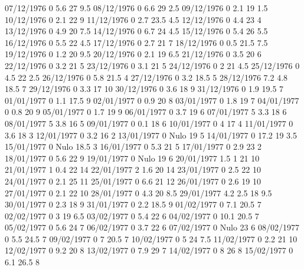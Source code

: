 07/12/1976  0      5.6    27     9.5 
08/12/1976  0      6.6    29     2.5 
09/12/1976  0      2.1    19     1.5 
10/12/1976  0      2.1    22     9 
11/12/1976  0      2.7    23.5   4.5 
12/12/1976  0      4.4    23     4 
13/12/1976  0      4.9    20     7.5 
14/12/1976  0      6.7    24     4.5 
15/12/1976  0      5.4    26     5.5 
16/12/1976  0      5.5    22     4.5 
17/12/1976  0      2.7    21     7 
18/12/1976  0      0.5    21.5   7.5 
19/12/1976  0      1.2    20     9.5 
20/12/1976  0      2.1    19     6.5 
21/12/1976  0      3.5    20     6 
22/12/1976  0      3.2    21     5 
23/12/1976  0      3.1    21     5 
24/12/1976  0      2      21     4.5 
25/12/1976  0      4.5    22     2.5 
26/12/1976  0      5.8    21.5   4 
27/12/1976  0      3.2    18.5   5 
28/12/1976  7.2    4.8    18.5   7 
29/12/1976  0      3.3    17     10 
30/12/1976  0      3.6    18     9 
31/12/1976  0      1.9    19.5   7 
01/01/1977  0      1.1    17.5   9 
02/01/1977  0      0.9    20     8 
03/01/1977  0      1.8    19     7 
04/01/1977  0      0.8    20     9 
05/01/1977  0      1.7    19     9 
06/01/1977  0      3.7    19     6 
07/01/1977  5      3.3    18     6 
08/01/1977  5      3.8    16     5 
09/01/1977  0      0.1    18     6 
10/01/1977  0      4      17     4 
11/01/1977  0      3.6    18     3 
12/01/1977  0      3.2    16     2 
13/01/1977  0     Nulo    19     5 
14/01/1977  0      17.2   19     3.5 
15/01/1977  0     Nulo    18.5   3 
16/01/1977  0      5.3    21     5 
17/01/1977  0      2.9    23     2 
18/01/1977  0      5.6    22     9 
19/01/1977  0     Nulo    19     6 
20/01/1977  1.5    1      21     10 
21/01/1977  1      0.4    22     14 
22/01/1977  2      1.6    20     14 
23/01/1977  0      2.5    22     10 
24/01/1977  0      2.1    25     11 
25/01/1977  0      6.6    21     12 
26/01/1977  0      2.6    19     10 
27/01/1977  0      2.1    22     10 
28/01/1977  0      4.3    20     8.5 
29/01/1977  4.2    2.5    18     9.5 
30/01/1977  0      2.3    18     9 
31/01/1977  0      2.2    18.5   9 
01/02/1977  0      7.1    20.5   7 
02/02/1977  0      3      19     6.5 
03/02/1977  0      5.4    22     6 
04/02/1977  0      10.1   20.5   7 
05/02/1977  0      5.6    24     7 
06/02/1977  0      3.7    22     6 
07/02/1977  0     Nulo    23     6 
08/02/1977  0      5.5    24.5   7 
09/02/1977  0      7      20.5   7 
10/02/1977  0      5      24     7.5 
11/02/1977  0      2.2    21     10 
12/02/1977  0      9.2    20     8 
13/02/1977  0      7.9    29     7 
14/02/1977  0      8      26     8 
15/02/1977  0      6.1    26.5   8 
